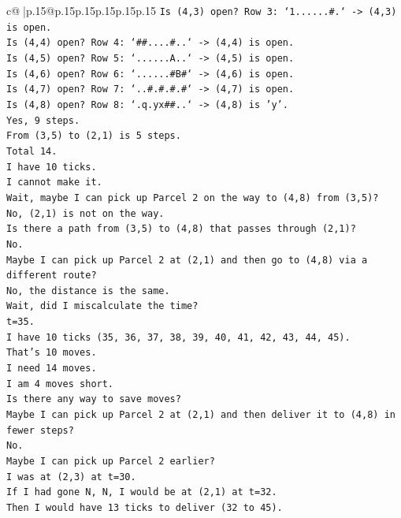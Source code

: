 \documentclass{article}
\begin{document}
{\begin{supertabular}{c@{$\;$}|p{.15\linewidth}@{}p{.15\linewidth}p{.15\linewidth}p{.15\linewidth}p{.15\linewidth}p{.15\linewidth}}
{{{\texttt{Is (4,3) open? Row 3: `1......\#.` {-}> (4,3) is open.} \\
\texttt{Is (4,4) open? Row 4: `\#\#....\#..` {-}> (4,4) is open.} \\
\texttt{Is (4,5) open? Row 5: `......A..` {-}> (4,5) is open.} \\
\texttt{Is (4,6) open? Row 6: `......\#B\#` {-}> (4,6) is open.} \\
\texttt{Is (4,7) open? Row 7: `..\#.\#.\#.\#` {-}> (4,7) is open.} \\
\texttt{Is (4,8) open? Row 8: `.q.yx\#\#..` {-}> (4,8) is 'y'.} \\
\texttt{Yes, 9 steps.} \\
\texttt{From (3,5) to (2,1) is 5 steps.} \\
\texttt{Total 14.} \\
\texttt{I have 10 ticks.} \\
\texttt{I cannot make it.} \\
\texttt{Wait, maybe I can pick up Parcel 2 on the way to (4,8) from (3,5)?} \\
\texttt{No, (2,1) is not on the way.} \\
\texttt{Is there a path from (3,5) to (4,8) that passes through (2,1)?} \\
\texttt{No.} \\
\texttt{Maybe I can pick up Parcel 2 at (2,1) and then go to (4,8) via a different route?} \\
\texttt{No, the distance is the same.} \\
\texttt{Wait, did I miscalculate the time?} \\
\texttt{t=35.} \\
\texttt{I have 10 ticks (35, 36, 37, 38, 39, 40, 41, 42, 43, 44, 45).} \\
\texttt{That's 10 moves.} \\
\texttt{I need 14 moves.} \\
\texttt{I am 4 moves short.} \\
\texttt{Is there any way to save moves?} \\
\texttt{Maybe I can pick up Parcel 2 at (2,1) and then deliver it to (4,8) in fewer steps?} \\
\texttt{No.} \\
\texttt{Maybe I can pick up Parcel 2 earlier?} \\
\texttt{I was at (2,3) at t=30.} \\
\texttt{If I had gone N, N, I would be at (2,1) at t=32.} \\
\texttt{Then I would have 13 ticks to deliver (32 to 45).} \\
}}}
\end{supertabular}}
\end{document}
